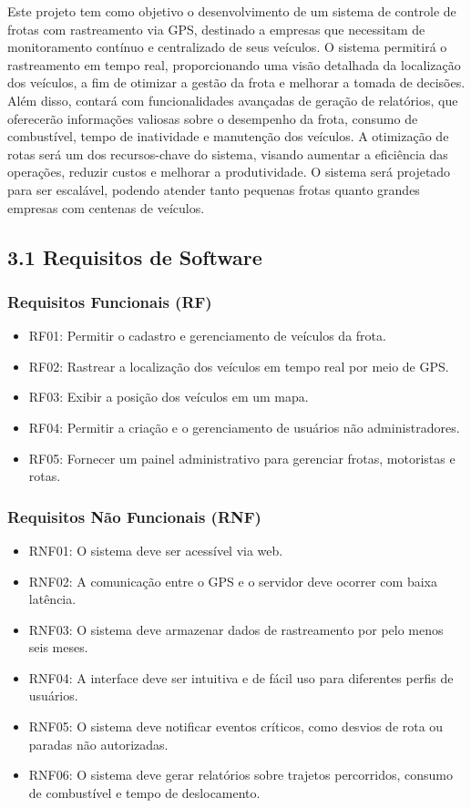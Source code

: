 \documentclass[12pt]{article}
\begin{document}
Este projeto tem como objetivo o desenvolvimento de um sistema de controle de frotas com rastreamento via GPS, destinado a empresas que necessitam de monitoramento contínuo e centralizado de seus veículos. O sistema permitirá o rastreamento em tempo real, proporcionando uma visão detalhada da localização dos veículos, a fim de otimizar a gestão da frota e melhorar a tomada de decisões. Além disso, contará com funcionalidades avançadas de geração de relatórios, que oferecerão informações valiosas sobre o desempenho da frota, consumo de combustível, tempo de inatividade e manutenção dos veículos. A otimização de rotas será um dos recursos-chave do sistema, visando aumentar a eficiência das operações, reduzir custos e melhorar a produtividade. O sistema será projetado para ser escalável, podendo atender tanto pequenas frotas quanto grandes empresas com centenas de veículos.

\subsection*{3.1 Requisitos de Software}

\subsubsection*{Requisitos Funcionais (RF)}
\begin{itemize}
    \item RF01: Permitir o cadastro e gerenciamento de veículos da frota.
    \item RF02: Rastrear a localização dos veículos em tempo real por meio de GPS.
    \item RF03: Exibir a posição dos veículos em um mapa.
    \item RF04: Permitir a criação e o gerenciamento de usuários não administradores.
    \item RF05: Fornecer um painel administrativo para gerenciar frotas, motoristas e rotas.
\end{itemize}

\subsubsection*{Requisitos Não Funcionais (RNF)}
\begin{itemize}
    \item RNF01: O sistema deve ser acessível via web.
    \item RNF02: A comunicação entre o GPS e o servidor deve ocorrer com baixa latência.
    \item RNF03: O sistema deve armazenar dados de rastreamento por pelo menos seis meses.
    \item RNF04: A interface deve ser intuitiva e de fácil uso para diferentes perfis de usuários.
    \item RNF05: O sistema deve notificar eventos críticos, como desvios de rota ou paradas não autorizadas.
    \item RNF06: O sistema deve gerar relatórios sobre trajetos percorridos, consumo de combustível e tempo de deslocamento.
\end{itemize}
\end{document}
